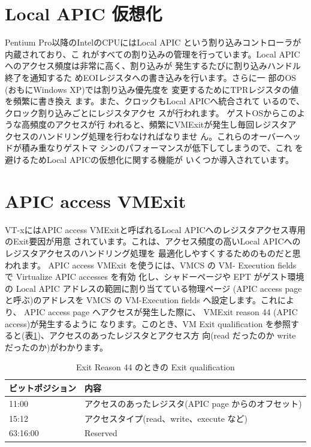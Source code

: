\section{Local APIC 仮想化}

 Pentium Pro以降のIntelのCPUにはLocal APIC
という割り込みコントローラが内蔵されており、こ
れがすべての割り込みの管理を行っています。Local
APICへのアクセス頻度は非常に高く、割り込みが
発生するたびに割り込みハンドル終了を通知するた
めEOIレジスタへの書き込みを行います。さらに一
部のOS (おもにWindows XP)では割り込み優先度を
変更するためにTPRレジスタの値を頻繁に書き換え
ます。また、クロックもLocal APICへ統合されて
いるので、クロック割り込みごとにレジスタアクセ
スが行われます。
 ゲストOSからこのような高頻度のアクセスが行
われると、頻繁にVMExitが発生し毎回レジスタア
クセスのハンドリング処理を行わなければなりませ
ん。これらのオーバーヘッドが積み重なりゲストマ
シンのパフォーマンスが低下してしまうので、これ
を避けるためLocal APICの仮想化に関する機能が
いくつか導入されています。

\section{APIC access VMExit}

 VT-xにはAPIC access VMExitと呼ばれるLocal
APICへのレジスタアクセス専用のExit要因が用意
されています。これは、アクセス頻度の高いLocal
APICへのレジスタアクセスのハンドリング処理を
最適化しやすくするためのものだと思われます。
 APIC access VMExit を使うには、VMCS の VM-
Execution fields で Virtualize APIC accesses を有効
化し、シャドーページや EPT がゲスト環境の Local
APIC アドレスの範囲に割り当てている物理ページ
(APIC access page と呼ぶ)のアドレスを VMCS の
VM-Execution fields へ設定します。これにより、
APIC access page へアクセスが発生した際に、
VMExit reason 44 (APIC access)が発生するように
なります。このとき、VM Exit qualification を参照す
ると(表\ref{tab4})、アクセスのあったレジスタとアクセス方
向(read だったのか write だったのか)がわかります。

\begin{table}
\begin{tabular}{|l|l|} \hline
ビットポジション & 内容 \\
\hline
11:00 & アクセスのあったレジスタ(APIC page からのオフセット) \\
\hline
15:12 & アクセスタイプ(read、write、execute など) \\
\hline
63:16:00 & Reserved \\
\hline

\end{tabular}
\caption{Exit Reason 44 のときの Exit qualification}
\label{tab4}

\end{table}

